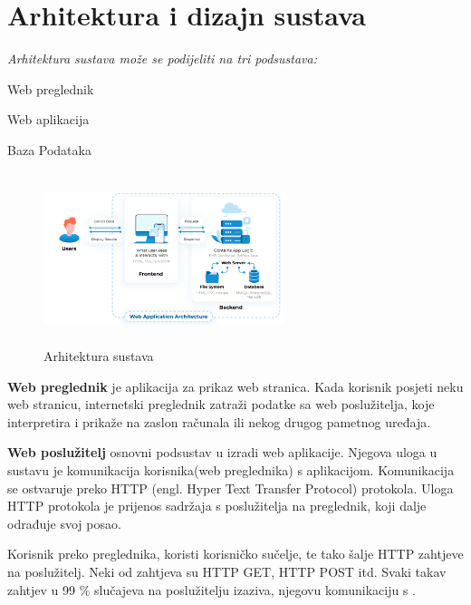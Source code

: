 \chapter{Arhitektura i dizajn sustava}


               \textit{Arhitektura sustava može se podijeliti  na tri podsustava: }

              \begin{packed_item}
               \item  Web  preglednik
                \item   Web aplikacija
                \item    Baza Podataka

                \end{packed_item}

                 \begin{figure}[H]
                     \includegraphics[width=7cm, height=5cm ]{./slike/arhitektura.png}
                      \centering
                      \caption{Arhitektura sustava}
                  \end{figure}


                  \textbf{Web preglednik} je aplikacija za prikaz web stranica. Kada korisnik posjeti neku web stranicu, internetski preglednik zatraži podatke
                                 sa web poslužitelja, koje interpretira i prikaže na zaslon računala ili nekog drugog pametnog uređaja.

                  \textbf{Web poslužitelj} osnovni podsustav u izradi web aplikacije. Njegova uloga u sustavu je komunikacija korisnika(web preglednika) s 
                                 aplikacijom. Komunikacija se ostvaruje preko HTTP (engl. Hyper Text Transfer Protocol) protokola. Uloga HTTP protokola je prijenos 
                                 sadržaja s poslužitelja na preglednik, koji dalje odrađuje svoj posao.
                            
                                Korisnik preko preglednika, koristi korisničko sučelje, te tako šalje HTTP zahtjeve na poslužitelj. Neki od zahtjeva su HTTP GET, HTTP POST 
                                itd. Svaki takav zahtjev u 99 \% slučajeva na poslužitelju izaziva, njegovu komunikaciju s .

